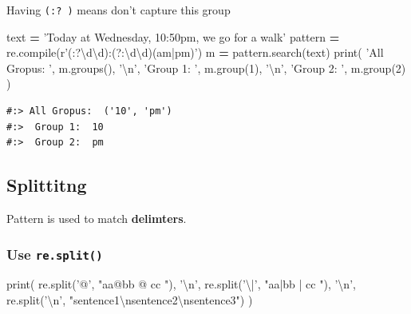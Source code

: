\documentclass[
]{book}
\newenvironment{Shaded}{\begin{snugshade}}{\end{snugshade}}
\newcommand{\BuiltInTok}[1]{#1}
\newcommand{\CharTok}[1]{\textcolor[rgb]{0.5,0.5,0.5}{#1}}
\newcommand{\DecValTok}[1]{\textcolor[rgb]{0.06,0.06,0.06}{#1}}
\newcommand{\NormalTok}[1]{#1}
\newcommand{\OperatorTok}[1]{\textcolor[rgb]{0.43,0.43,0.43}{\textbf{#1}}}
\newcommand{\StringTok}[1]{\textcolor[rgb]{0.5,0.5,0.5}{#1}}
\newcommand{\VerbatimStringTok}[1]{\textcolor[rgb]{0.5,0.5,0.5}{#1}}
\begin{document}
Having \texttt{(:?\ )} means don't capture this group

\begin{Shaded}
\begin{Highlighting}[]
\NormalTok{text }\OperatorTok{=} \StringTok{'Today at Wednesday, 10:50pm, we go for a walk'}
\NormalTok{pattern }\OperatorTok{=}\NormalTok{ re.}\BuiltInTok{compile}\NormalTok{(}\VerbatimStringTok{r'(:?\textbackslash{}d\textbackslash{}d):(?:\textbackslash{}d\textbackslash{}d)(am|pm)'}\NormalTok{)}
\NormalTok{m }\OperatorTok{=}\NormalTok{ pattern.search(text)}
\BuiltInTok{print}\NormalTok{(}
  \StringTok{'All Gropus: '}\NormalTok{, m.groups(), }\StringTok{'}\CharTok{\textbackslash{}n}\StringTok{'}\NormalTok{,}
  \StringTok{'Group 1: '}\NormalTok{, m.group(}\DecValTok{1}\NormalTok{), }\StringTok{'}\CharTok{\textbackslash{}n}\StringTok{'}\NormalTok{,}
  \StringTok{'Group 2: '}\NormalTok{, m.group(}\DecValTok{2}\NormalTok{) )}
\end{Highlighting}
\end{Shaded}

\begin{verbatim}
#:> All Gropus:  ('10', 'pm') 
#:>  Group 1:  10 
#:>  Group 2:  pm
\end{verbatim}

\hypertarget{splittitng}{%
\subsection{Splittitng}\label{splittitng}}

Pattern is used to match \textbf{delimters}.

\hypertarget{use-re.split}{%
\subsubsection{\texorpdfstring{Use \texttt{re.split()}}{Use re.split()}}\label{use-re.split}}

\begin{Shaded}
\begin{Highlighting}[]
\BuiltInTok{print}\NormalTok{( re.split(}\StringTok{'@'}\NormalTok{,  }\StringTok{"aa@bb @ cc "}\NormalTok{), }\StringTok{'}\CharTok{\textbackslash{}n}\StringTok{'}\NormalTok{,}
\NormalTok{       re.split(}\StringTok{'\textbackslash{}|'}\NormalTok{, }\StringTok{"aa|bb | cc "}\NormalTok{), }\StringTok{'}\CharTok{\textbackslash{}n}\StringTok{'}\NormalTok{,}
\NormalTok{       re.split(}\StringTok{'}\CharTok{\textbackslash{}n}\StringTok{'}\NormalTok{, }\StringTok{"sentence1}\CharTok{\textbackslash{}n}\StringTok{sentence2}\CharTok{\textbackslash{}n}\StringTok{sentence3"}\NormalTok{) )}
\end{Highlighting}
\end{Shaded}
\end{document}
